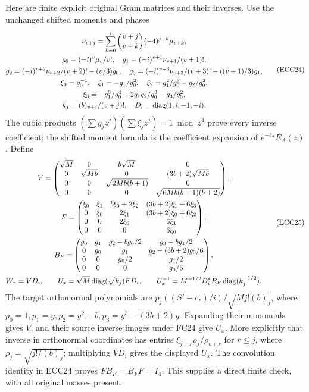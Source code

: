 \documentclass[11pt]{article}
\begin{document}
Here are finite explicit original Gram matrices and their inverses.
Use the unchanged shifted moments and phases
\begin{equation}
 \begin{gathered}
 \nu_{v+j}=\sum_{k=0}^{j}\binom{v+j}{v+k}(-4)^{j-k}\mu_{v+k},\\
 g_0=(-i)^v\mu_v/v!,\quad g_1=(-i)^{v+1}\nu_{v+1}/(v+1)!,\\
 g_2=(-i)^{v+2}\nu_{v+2}/(v+2)!-(v/3)g_0,\quad
 g_3=(-i)^{v+3}\nu_{v+3}/(v+3)!-((v+1)/3)g_1,\\
 \xi_0=g_0^{-1},\quad\xi_1=-g_1/g_0^2,\quad
 \xi_2=g_1^2/g_0^3-g_2/g_0^2,\\
 \xi_3=-g_1^3/g_0^4+2g_1g_2/g_0^3-g_3/g_0^2,\\
 k_j=(b)_{v+j}/(v+j)!,\quad D_i=\operatorname{diag}(1,i,-1,-i).
 \end{gathered}\tag{ECC24}
\end{equation}
The cubic products $(\sum g_jz^j)(\sum\xi_jz^j)=1\bmod z^4$
prove every inverse coefficient; the shifted moment formula is the
coefficient expansion of $e^{-4z}E_A(z)$. Define
\begin{equation}
 \begin{gathered}
 V=\begin{pmatrix}\sqrt M&0&b\sqrt M&0\\
 0&\sqrt{Mb}&0&(3b+2)\sqrt{Mb}\\
 0&0&\sqrt{2Mb(b+1)}&0\\0&0&0&\sqrt{6Mb(b+1)(b+2)}\end{pmatrix},\\
 F=\begin{pmatrix}\xi_0&\xi_1&b\xi_0+2\xi_2&(3b+2)\xi_1+6\xi_3\\
 0&\xi_0&2\xi_1&(3b+2)\xi_0+6\xi_2\\
 0&0&2\xi_0&6\xi_1\\0&0&0&6\xi_0\end{pmatrix},\\
 B_F=\begin{pmatrix}g_0&g_1&g_2-bg_0/2&g_3-bg_1/2\\
 0&g_0&g_1&g_2-(3b+2)g_0/6\\0&0&g_0/2&g_1/2\\0&0&0&g_0/6\end{pmatrix},\\
 W_x=VD_i,\qquad U_x=\sqrt M\operatorname{diag}(\sqrt{k_j})FD_i,\qquad
 U_x^{-1}=M^{-1/2}D_i^*B_F\operatorname{diag}(k_j^{-1/2}).
 \end{gathered}\tag{ECC25}
\end{equation}
The target orthonormal polynomials are $p_j((S'-c_*)/i)/\sqrt{Mj!(b)_j}$,
where $p_0=1,p_1=y,p_2=y^2-b,p_3=y^3-(3b+2)y$.
Expanding their monomials gives $V$, and their source inverse images
under FC24 give $U_x$. More explicitly that inverse in orthonormal
coordinates has entries $\xi_{j-r}\rho_j/\rho_{v+r}$ for $r\le j$, where
$\rho_j=\sqrt{j!/(b)_j}$; multiplying $VD_i$ gives the displayed $U_x$.
The convolution identity in ECC24 proves $FB_F=B_FF=I_4$.
This supplies a direct finite check, with all original masses present.
\end{document}
